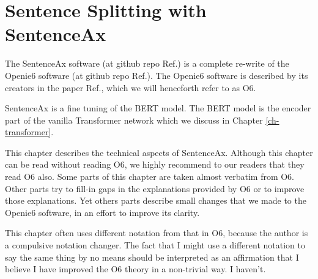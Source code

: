 \chapter{Sentence Splitting with SentenceAx}
\label{ch-sentence-ax}

%
%
%


The SentenceAx software (at github repo Ref.\cite{sentence-ax-github}) is a complete re-write of the Openie6 software
(at github repo Ref.\cite{openie6-repo}).
 The Openie6 software is described by its creators
 in the paper Ref.\cite{openie6-paper},
 which we will henceforth refer to as O6.

 SentenceAx is a fine tuning of the BERT model.
 The BERT model is the encoder part of the
 vanilla Transformer network which
 we discuss in Chapter \ref{ch-transformer}.

 This chapter describes the technical
 aspects of SentenceAx. Although this chapter
 can be read without reading O6, we highly recommend to
 our readers that they read O6 also.
 Some parts of this chapter are taken almost verbatim
 from O6. Other parts try to fill-in gaps in the
 explanations provided by O6 or to improve those explanations. Yet others parts describe small changes that we made to the Openie6 software, in an effort to improve its clarity.



 This chapter often uses different
 notation from that in O6, because the author
 is a compulsive notation changer. The fact that I
 might use a different notation to say the same thing by no means should be
 interpreted  as an affirmation that I believe I have improved the O6 theory in a non-trivial way. I haven't.

